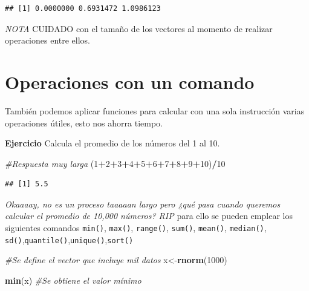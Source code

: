 \documentclass[
]{book}
\newenvironment{Shaded}{\begin{snugshade}}{\end{snugshade}}
\newcommand{\CommentTok}[1]{\textcolor[rgb]{0.56,0.35,0.01}{\textit{#1}}}
\newcommand{\DecValTok}[1]{\textcolor[rgb]{0.00,0.00,0.81}{#1}}
\newcommand{\FunctionTok}[1]{\textcolor[rgb]{0.13,0.29,0.53}{\textbf{#1}}}
\newcommand{\NormalTok}[1]{#1}
\newcommand{\OtherTok}[1]{\textcolor[rgb]{0.56,0.35,0.01}{#1}}
\newcommand{\SpecialCharTok}[1]{\textcolor[rgb]{0.81,0.36,0.00}{\textbf{#1}}}
\begin{document}
\begin{verbatim}
## [1] 0.0000000 0.6931472 1.0986123
\end{verbatim}

\emph{NOTA} CUIDADO con el tamaño de los vectores al momento de realizar operaciones entre ellos.

\hypertarget{operaciones-con-un-comando}{%
\section{Operaciones con un comando}\label{operaciones-con-un-comando}}

También podemos aplicar funciones para calcular con una sola instrucción varias operaciones útiles, esto nos ahorra tiempo.

\textbf{Ejercicio} Calcula el promedio de los números del 1 al 10.

\begin{Shaded}
\begin{Highlighting}[]
\CommentTok{\#Respuesta muy larga }
\NormalTok{(}\DecValTok{1}\SpecialCharTok{+}\DecValTok{2}\SpecialCharTok{+}\DecValTok{3}\SpecialCharTok{+}\DecValTok{4}\SpecialCharTok{+}\DecValTok{5}\SpecialCharTok{+}\DecValTok{6}\SpecialCharTok{+}\DecValTok{7}\SpecialCharTok{+}\DecValTok{8}\SpecialCharTok{+}\DecValTok{9}\SpecialCharTok{+}\DecValTok{10}\NormalTok{)}\SpecialCharTok{/}\DecValTok{10}
\end{Highlighting}
\end{Shaded}

\begin{verbatim}
## [1] 5.5
\end{verbatim}

\emph{Okaaaay, no es un proceso taaaaan largo pero ¿qué pasa cuando queremos calcular el promedio de 10,000 números? RIP} para ello se pueden emplear los siguientes comandos \texttt{min()}, \texttt{max()}, \texttt{range()}, \texttt{sum()}, \texttt{mean()}, \texttt{median()}, \texttt{sd()},\texttt{quantile()},\texttt{unique()},\texttt{sort()}

\begin{Shaded}
\begin{Highlighting}[]
\CommentTok{\#Se define el vector que incluye mil datos}
\NormalTok{x}\OtherTok{\textless{}{-}}\FunctionTok{rnorm}\NormalTok{(}\DecValTok{1000}\NormalTok{)}

\FunctionTok{min}\NormalTok{(x) }\CommentTok{\#Se obtiene el valor mínimo}
\end{Highlighting}
\end{Shaded}
\end{document}
